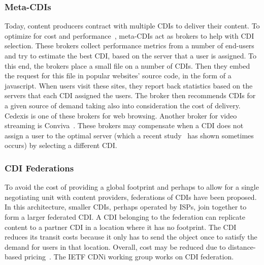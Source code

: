 \subsubsection{Meta-CDIs} Today, content producers contract with multiple CDIs
to deliver their content.  To optimize for cost and
performance~\cite{Optimizing:SIGCOMM2012}, meta-CDIs act as brokers to help
with CDI selection. These brokers collect performance metrics from a number of
end-users and try to estimate the best CDI, based on the server that a user is
assigned. To this end, the brokers place a small file on a number of CDIs. Then
they embed the request for this file in popular websites' source code, in the
form of a javascript. When users visit these sites, they report back statistics
based on the servers that each CDI assigned the users. The broker then
recommends CDIs for a given source of demand taking also into consideration the
cost of delivery. Cedexis is one of these brokers for web browsing.  Another
broker for video streaming is Conviva~\cite{Conviva2011}. These brokers may
compensate when a CDI does not assign a user to the optimal server (which a
recent study~\cite{PADIS2010} has shown sometimes occurs) by selecting a
different CDI.


\subsubsection{CDI Federations} To avoid the cost of providing a global
footprint and perhaps to allow for a single negotiating unit with content
providers, federations of CDIs have been proposed. In this architecture,
smaller CDIs, perhaps operated by ISPs, join together to form a larger
federated CDI.  A CDI belonging to the federation can replicate content to a
partner CDI in a location where it has no footprint.  The CDI reduces its
transit costs because it only has to send the object once to satisfy the demand
for users in that location. Overall, cost may be reduced due to distance-based
pricing~\cite{HowManyTiers}. The IETF CDNi working group \cite{CDNi} works on
CDI federation.

